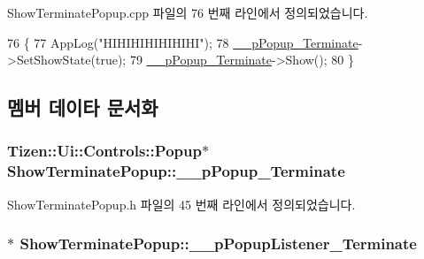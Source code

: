 Show\+Terminate\+Popup.\+cpp 파일의 76 번째 라인에서 정의되었습니다.


\begin{DoxyCode}
76                                        \{
77     AppLog(\textcolor{stringliteral}{"HIHIHIHIHIHIHI"});
78     \hyperlink{class_show_terminate_popup_a60cd94bd39638e83326aff8d48922603}{\_\_pPopup\_Terminate}->SetShowState(\textcolor{keyword}{true});
79     \hyperlink{class_show_terminate_popup_a60cd94bd39638e83326aff8d48922603}{\_\_pPopup\_Terminate}->Show();
80 \}
\end{DoxyCode}


\subsection{멤버 데이타 문서화}
\hypertarget{class_show_terminate_popup_a60cd94bd39638e83326aff8d48922603}{
\subsubsection[{\+\_\+\+\_\+p\+Popup\+\_\+\+Terminate}]{\setlength{\rightskip}{0pt plus 5cm}Tizen\+::\+Ui\+::\+Controls\+::\+Popup$\ast$ Show\+Terminate\+Popup\+::\+\_\+\+\_\+p\+Popup\+\_\+\+Terminate\hspace{0.3cm}{\ttfamily [private]}}}\label{class_show_terminate_popup_a60cd94bd39638e83326aff8d48922603}


Show\+Terminate\+Popup.\+h 파일의 45 번째 라인에서 정의되었습니다.

\hypertarget{class_show_terminate_popup_af444665dbf167ec640964339cf2e3dc1}{
\subsubsection[{\+\_\+\+\_\+p\+Popup\+Listener\+\_\+\+Terminate}]{$\ast$ Show\+Terminate\+Popup\+::\+\_\+\+\_\+p\+Popup\+Listener\+\_\+\+Terminate\hspace{0.3cm}{\ttfamily [private]}}}\label{class_show_terminate_popup_af444665dbf167ec640964339cf2e3dc1}



